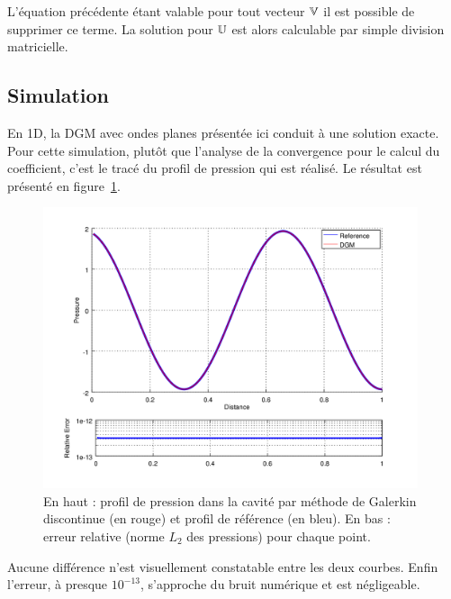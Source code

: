 L'équation précédente étant valable pour tout vecteur $\mathbb{V}$ il est possible de supprimer ce terme.
La solution pour $\mathbb{U}$ est alors calculable par simple division matricielle.

\subsection{Simulation}

En 1D, la DGM avec ondes planes présentée ici conduit à une solution exacte. Pour cette simulation, plutôt que l'analyse
de la convergence pour le calcul du coefficient, c'est le tracé du profil de pression qui est réalisé. Le résultat est
présenté en figure~\ref{fig:dgm:simul}.

\begin{figure}[p]
    \centering
    \includegraphics[width=11cm]{part2/figs/comp_hermiteFEM_dgm.png}
    \caption{\label{fig:dgm:simul}En haut : profil de pression dans la cavité par méthode de Galerkin discontinue (en rouge) et
    profil de référence (en bleu). En bas : erreur relative (norme $L_2$ des pressions) pour chaque point.}
\end{figure}

Aucune différence n'est visuellement constatable entre les deux courbes. Enfin l'erreur, à presque $10^{-13}$,
s'approche du bruit numérique et est négligeable.
